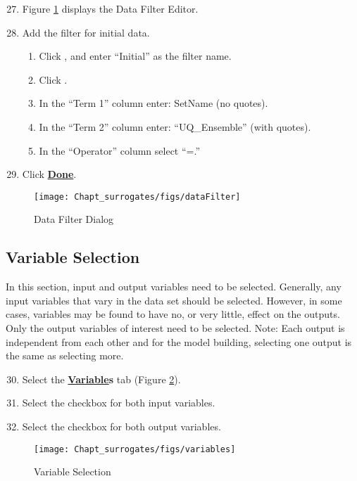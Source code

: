 \begin{enumerate}
	\setcounter{enumi}{26}
	\item Figure \ref{fig.tut.sur.dataFilter} displays the Data Filter Editor. 
	\item Add the filter for initial data.
	\begin{enumerate}
		\item Click , and enter ``Initial'' as the filter name.
		\item Click .
		\item In the ``Term 1'' column enter: SetName (no quotes).
		\item In the ``Term 2'' column enter: ``UQ\_Ensemble'' (with quotes).
		\item In the ``Operator'' column select ``=.''	
	\end{enumerate}
	\item Click \textbf{\underline{Done}}.
\end{enumerate}
\begin{figure}[H]
	\begin{center}
		\texttt{[image: Chapt\_surrogates/figs/dataFilter]}
		\caption{Data Filter Dialog}
		\label{fig.tut.sur.dataFilter}
	\end{center}
\end{figure}

\subsection{Variable Selection}
In this section, input and output variables need to be selected. Generally, any input variables that vary in the data set should be selected. However, in some cases, variables may be found to have no, or very little, effect on the outputs. Only the output variables of interest need to be selected. Note: Each output is independent from each other and for the model building, selecting one output is the same as selecting more.

\begin{enumerate}
	\setcounter{enumi}{29}
	\item Select the \textbf{\underline{Variable}s} tab (Figure \ref{fig.tut.sur.vaiables}).
	\item Select the checkbox for both input variables.
	\item Select the checkbox for both output variables.
\end{enumerate}
\begin{figure}[H]
	\begin{center}
		\texttt{[image: Chapt\_surrogates/figs/variables]}
		\caption{Variable Selection}
		\label{fig.tut.sur.vaiables}
	\end{center}
\end{figure}


